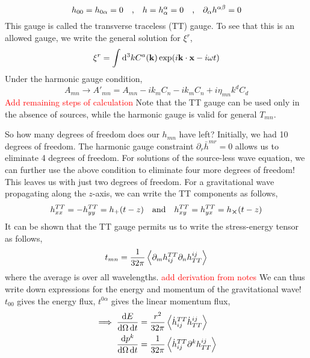 \documentclass[a4paper,11pt]{article}
\begin{document}
\begin{equation*}
h_{00} = h_{0\alpha} = 0 \qq{,} h = h^\alpha_\alpha = 0 \qq{,} \partial_\alpha h^{\alpha \beta} = 0
\end{equation*}
This gauge is called the transverse traceless (TT) gauge. To see that this is an allowed gauge, we write the general solution for $ \xi^r $,
\begin{equation*}
\xi^r = \int \dd^3{k} C^a(\vb{k}) \exp(i \vb{k} \cdot \vb{x} - i \omega t)
\end{equation*}
Under the harmonic gauge condition, 
\begin{equation*}
A_{mn} \rightarrow A'_{mn} = A_{mn} - ik_m C_n - i k_m C_n + i \eta_{mn} k^d C_d
\end{equation*}
\textcolor{red}{Add remaining steps of calculation}
Note that the TT gauge can be used only in the absence of sources, while the harmonic gauge is valid for general $ T_{mn} $.

So how many degrees of freedom does our $ h_{mn} $ have left? Initially, we had 10 degrees of freedom. The harmonic gauge constraint $ \partial_r \bar{h}^{mr} = 0 $ allows us to eliminate 4 degrees of freedom. For solutions of the source-less wave equation, we can further use the above condition to eliminate four more degrees of freedom! This leaves us with just two degrees of freedom. For a gravitational wave propagating along the $ z $-axis, we can write the TT components as follows,
\begin{equation*}
h_{xx}^{TT} = - h_{yy}^{TT} = h_+ (t-z) \qq{and} h_{xy}^{TT} = h_{yx}^{TT} = h_{\cross} (t-z)
\end{equation*}
It can be shown that the TT gauge permits us to write the stress-energy tensor as follows,
\begin{equation*}
t_{mn} = \dfrac{1}{32 \pi} \ev{\partial_m h^{TT}_{ij} \partial_n h^{ij}_{TT}}
\end{equation*}
where the average is over all wavelengths. \textcolor{red}{add derivation from notes}
We can thus write down expressions for the energy and momentum of the gravitational wave! $ t_{00} $ gives the energy flux, $ t^{0\alpha} $ gives the linear momentum flux, 
\begin{align*}
\implies \dfrac{\dd{E}}{\dd{\Omega} \dd{t}} &=  \dfrac{r^2}{32 \pi} \ev{ \dot{h}^{TT}_{ij} \dot{h}^{ij}_{TT}} \\
 \dfrac{\dd{p^k}}{\dd{\Omega} \dd{t}} &= \dfrac{1}{32 \pi} \ev{\dot{h}^{TT}_{ij} \partial^k h^{ij}_{TT}}
\end{align*}
\end{document}
